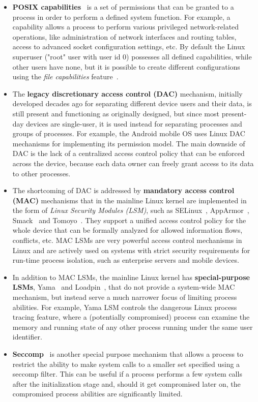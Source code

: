 \begin{itemize}
	\item \textbf{POSIX capabilities}~\cite{caps} is a set of permissions that can be granted to a process in order to perform a defined system function. For example, a  capability allows a process to perform various privileged network-related operations, like administration of network interfaces and routing tables, access to advanced socket configuration settings, etc. By default the Linux superuser ("root" user with user id 0) possesses all defined capabilities, while other users have none, but it is possible to create different configurations using the \textit{file capabilities} feature~\cite{filecaps}. 
	\item The \textbf{legacy discretionary access control (DAC)} mechanism, initially developed decades ago for separating different device users and their data, is still present and functioning as originally designed, but since most present-day devices are single-user, it is used instead for separating processes and groups of processes. For example, the Android mobile OS uses Linux DAC mechanisms for implementing its permission model. The main downside of DAC is the lack of a centralized access control policy that can be enforced across the device, because each data owner can freely grant access to its data to other processes. 
	\item The shortcoming of DAC is addressed by \textbf{mandatory access control (MAC)} mechanisms that in the mainline Linux kernel are implemented in the form of \textit{Linux Security Modules (LSM)}, such as SELinux~\cite{smalley2001implementing}, AppArmor~\cite{bauer2006paranoid}, Smack~\cite{bauer2006paranoid} and Tomoyo~\cite{tomoyo}. They support a unified access control policy for the whole device that can be formally analyzed for allowed information flows, conflicts, etc. MAC LSMs are very powerful access control mechanisms in Linux and are actively used on systems with strict security requirements for run-time process isolation, such as enterprise servers and mobile devices. 
	\item In addition to MAC LSMs, the mainline Linux kernel has \textbf{special-purpose LSMs}, Yama~\cite{yama} and Loadpin~\cite{loadpin}, that do not provide a system-wide MAC mechanism, but instead serve a much narrower focus of limiting process abilities. For example, Yama LSM controls the dangerous Linux process tracing feature, where a (potentially compromised) process can examine the memory and running state of any other process running under the same user identifier. 
	\item \textbf{Seccomp}~\cite{seccomp2016} is another special purpose mechanism that allows a process to restrict the ability to make system calls to a smaller set specified using a seccomp filter. This can be useful if a process performs a few system calls after the initialization stage and, should it get compromised later on, the compromised process abilities are significantly limited.
\end{itemize} 

